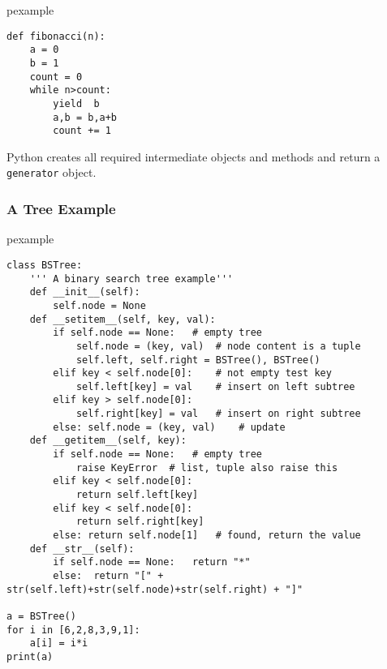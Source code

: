 \documentclass[trans,compress,xcolor=table]{beamer}
\begin{document}
\begin{frame}[fragile]
\begin{beamercolorbox}{pexample}
\begin{lstlisting}[escapeinside=\{\}]
def fibonacci(n):
	a = 0
	b = 1
	count = 0
	while n>count:
		yield  b
		a,b = b,a+b
		count += 1
\end{lstlisting}\end{beamercolorbox}
Python creates all required intermediate objects and methods and return
a \lstinline!generator! object.
\end{frame}

\begin{frame}[fragile]
\frametitle{A Tree Example}
\begin{beamercolorbox}{pexample}
\begin{lstlisting}[basicstyle=\tiny\ttfamily,escapeinside=\{\}]
class BSTree:
	''' A binary search tree example'''
	def __init__(self):
		self.node = None
	def __setitem__(self, key, val):
		if self.node == None:	# empty tree
			self.node = (key, val)	# node content is a tuple
			self.left, self.right = BSTree(), BSTree()
		elif key < self.node[0]:	# not empty test key
			self.left[key] = val	# insert on left subtree
		elif key > self.node[0]:	
			self.right[key] = val	# insert on right subtree
		else: self.node = (key, val)	# update
	def __getitem__(self, key):
		if self.node == None:	# empty tree
			raise KeyError	# list, tuple also raise this
		elif key < self.node[0]:
			return self.left[key]
		elif key < self.node[0]:
			return self.right[key]
		else: return self.node[1]	# found, return the value
    def __str__(self):
        if self.node == None:   return "*"
        else:  return "[" + str(self.left)+str(self.node)+str(self.right) + "]"

a = BSTree()
for i in [6,2,8,3,9,1]:
	a[i] = i*i
print(a)
\end{lstlisting}
\end{beamercolorbox}
\end{frame}
\end{document}
